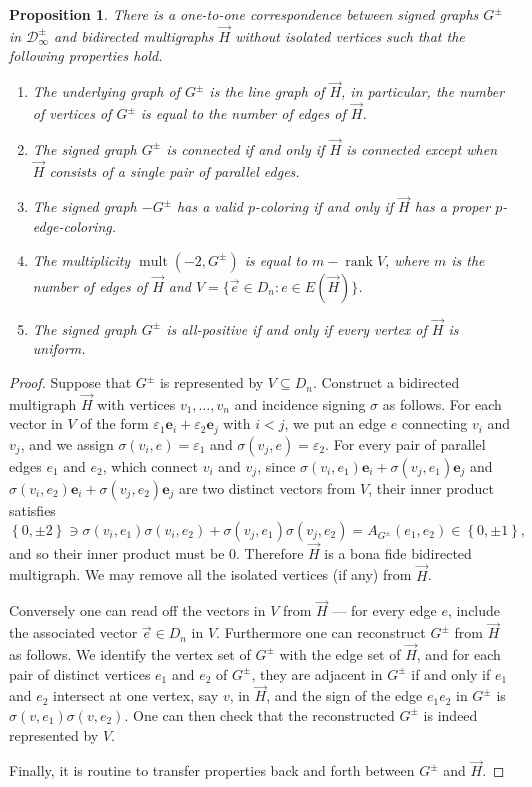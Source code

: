 \documentclass[11pt]{article}
\newtheorem{proposition}[theorem]{Proposition}
\theoremstyle{definition}
\theoremstyle{remark}
\DeclareMathOperator{\rank}{rank}
\newcommand{\sset}[1]{\left\{{#1}\right\}}
\newcommand{\eps}{\varepsilon}
\newcommand{\D}{\mathcal{D}}
\newcommand{\mult}{\operatorname{mult}}
\begin{document}
\begin{proposition} \label{lem:transfer}
    There is a one-to-one correspondence between signed graphs $G^\pm$ in $\D_\infty^\pm$ and bidirected multigraphs $\vec{H}$ without isolated vertices such that the following properties hold.
    \begin{enumerate}[label=(\arabic*)]
        \item The underlying graph of $G^\pm$ is the line graph of $\vec{H}$, in particular, the number of vertices of $G^\pm$ is equal to the number of edges of $\vec{H}$.
        \item The signed graph $G^\pm$ is connected if and only if $\vec{H}$ is connected except when $\vec{H}$ consists of a single pair of parallel edges.
        \item The signed graph $-G^\pm$ has a valid $p$-coloring if and only if $\vec{H}$ has a proper $p$-edge-coloring.
        \item The multiplicity $\mult(-2, G^\pm)$ is equal to $m - \rank V$, where $m$ is the number of edges of $\vec{H}$ and $V = \{\vec{e} \in D_n \colon e \in E(\vec{H})\}$.
        \item The signed graph $G^\pm$ is all-positive if and only if every vertex of $\vec{H}$ is uniform.
    \end{enumerate}    
\end{proposition}

\begin{proof}
    Suppose that $G^\pm$ is represented by $V \subseteq D_n$. Construct a bidirected multigraph $\vec{H}$ with vertices $v_1, \dots, v_n$ and incidence signing $\sigma$ as follows. For each vector in $V$ of the form $\eps_1 \bm{e}_i + \eps_2 \bm{e}_j$ with $i < j$, we put an edge $e$ connecting $v_i$ and $v_j$, and we assign $\sigma(v_i, e) = \eps_1$ and $\sigma(v_j, e) = \eps_2$. For every pair of parallel edges $e_1$ and $e_2$, which connect $v_i$ and $v_j$, since $\sigma(v_i, e_1)\bm{e}_i + \sigma(v_j, e_1)\bm{e}_j$ and $\sigma(v_i, e_2)\bm{e}_i + \sigma(v_j, e_2)\bm{e}_j$ are two distinct vectors from $V$, their inner product satisfies
    \[
        \sset{0, \pm2} \ni \sigma(v_i, e_1)\sigma(v_i, e_2) + \sigma(v_j, e_1)\sigma(v_j, e_2) = A_{G^\pm}(e_1,e_2) \in \sset{0,\pm 1},
    \]
    and so their inner product must be $0$. Therefore $\vec{H}$ is a bona fide bidirected multigraph. We may remove all the isolated vertices (if any) from $\vec{H}$.
    
    Conversely one can read off the vectors in $V$ from $\vec{H}$ --- for every edge $e$, include the associated vector $\vec{e} \in D_n$ in $V$. Furthermore one can reconstruct $G^\pm$ from $\vec{H}$ as follows. We identify the vertex set of $G^\pm$ with the edge set of $\vec{H}$, and for each pair of distinct vertices $e_1$ and $e_2$ of $G^\pm$, they are adjacent in $G^\pm$ if and only if $e_1$ and $e_2$ intersect at one vertex, say $v$, in $\vec{H}$, and the sign of the edge $e_1e_2$ in $G^\pm$ is $\sigma(v, e_1)\sigma(v, e_2)$. One can then check that the reconstructed $G^\pm$ is indeed represented by $V$.
    
    Finally, it is routine to transfer properties back and forth between $G^\pm$ and $\vec{H}$.
\end{proof}
\end{document}
